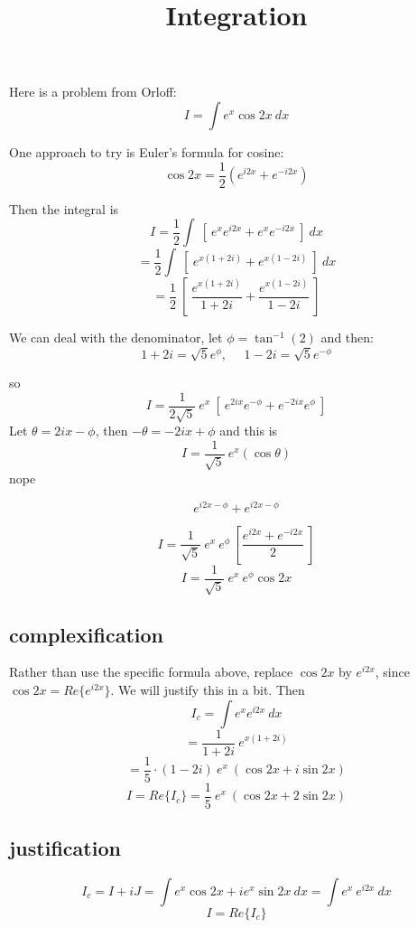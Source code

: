 \documentclass[11pt, oneside]{article}
\title{Integration}
\date{}
\begin{document}
\maketitle
\Large


Here is a problem from Orloff:
\[ I = \int e^x \cos 2x \ dx \]

One approach to try is Euler's formula for cosine:
\[ \cos 2x = \frac{1}{2} ( e^{i2x} + e^{-i2x}) \]

Then the integral is
\[ I = \frac{1}{2} \int \ [ \ e^{x} e^{i2x} + e^{x} e^{-i2x} \ ] \ dx \]
\[ = \frac{1}{2} \int \ [ \ e^{x(1 + 2i)}  + e^{x(1 -2i)} \ ] \ dx \]
\[ = \frac{1}{2} \ [ \  \frac{e^{x(1 + 2i)}}{1 + 2i}  + \frac{e^{x(1 - 2i)}}{1 - 2i} \ ] \]

We can deal with the denominator, let $\phi = \tan^{-1} (2)$ and then:
\[ 1 + 2i = \sqrt{5} e^{\phi}, \ \ \ \ \ \ 1 - 2i = \sqrt{5} e^{-\phi} \]

so
\[ I = \frac{1}{2 \sqrt{5}} \ e^x \ [ \ e^{2ix} e^{-\phi} + e^{-2ix} e^{\phi} \ ] \]
Let $\theta = 2ix - \phi$, then $- \theta = - 2ix + \phi$ and this is
\[ I = \frac{1}{\sqrt{5}} \ e^x (\cos \theta) \]
nope


\[ e^{i2x - \phi} + e^{i2x - \phi} \]

\[ I = \frac{1}{\sqrt{5}} \ e^x \ e^{\phi} \ [ \frac{e^{i2x} + e^{-i2x}}{2}\ ] \]
\[ I = \frac{1}{\sqrt{5}} \ e^x \ e^{\phi} \cos 2x \]

\subsection*{complexification}

Rather than use the specific formula above, replace $\cos 2x$ by $e^{i2x}$, since $\cos 2x = Re \{ e^{i2x} \}$.  We will justify this in a bit.  Then
\[ I_c = \int e^x e^{i2x} \ dx \]
\[ = \frac{1}{1 + 2i} \ e^{x(1+2i)} \]
\[ = \frac{1}{5} \cdot (1 - 2i) \ e^{x} \ (\cos 2x + i \sin 2x) \]
\[ I = Re \{ I_c \} = \frac{1}{5} \ e^x \ (\cos 2x + 2 \sin 2x) \]

\subsection*{justification}
\[ I_c = I + iJ = \int e^x \cos 2x + i e^x \sin 2x \ dx = \int e^x \ e^{i2x} \ dx \]
\[ I = Re \{ I_c \} \]
\end{document}
